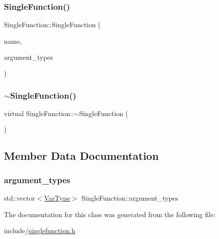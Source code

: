 \subsubsection{\texorpdfstring{Single\+Function()}{SingleFunction()}}
{\footnotesize\ttfamily Single\+Function\+::\+Single\+Function (\begin{DoxyParamCaption}\item[{std\+::string}]{name,  }\item[{std\+::vector$<$ \hyperlink{classVarType}{Var\+Type} $>$}]{argument\+\_\+types }\end{DoxyParamCaption})}

\mbox{\label{classSingleFunction_ae414926a60c49b4039e7cd41a304ed77}} 
\subsubsection{\texorpdfstring{$\sim$\+Single\+Function()}{~SingleFunction()}}
{\footnotesize\ttfamily virtual Single\+Function\+::$\sim$\+Single\+Function (\begin{DoxyParamCaption}{ }\end{DoxyParamCaption})\hspace{0.3cm}{\ttfamily [virtual]}}



\subsection{Member Data Documentation}
\mbox{\label{classSingleFunction_a345cc7c6a42587a62495688af6644a26}} 
\subsubsection{\texorpdfstring{argument\+\_\+types}{argument\_types}}
{\footnotesize\ttfamily std\+::vector$<$\hyperlink{classVarType}{Var\+Type}$>$ Single\+Function\+::argument\+\_\+types}



The documentation for this class was generated from the following file\+:\begin{DoxyCompactItemize}
\item 
include/\hyperlink{singlefunction_8h}{singlefunction.\+h}\end{DoxyCompactItemize}
